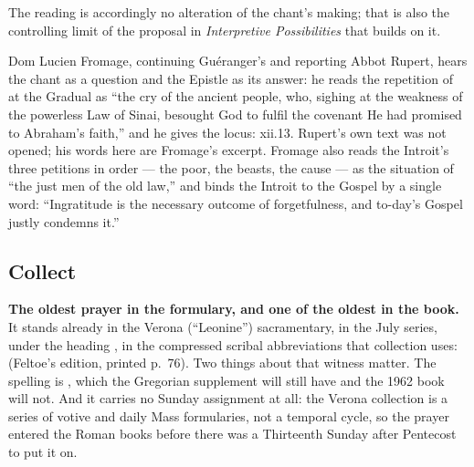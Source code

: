 The reading is accordingly no alteration of the chant's making; that is also
the controlling limit of the proposal in \textit{Interpretive Possibilities}
that builds on it.

Dom Lucien Fromage, continuing Guéranger's  and
reporting Abbot Rupert, hears the chant as a question and the Epistle as its
answer: he reads the
repetition of  at the Gradual as ``the
cry of the ancient people, who, sighing at the weakness of the powerless Law of
Sinai, besought God to fulfil the covenant He had promised to Abraham's
faith,'' and he gives the locus:  xii.13. Rupert's
own text was not opened; his words here are Fromage's excerpt.
Fromage also reads the Introit's three petitions in order --- the poor, the
beasts, the cause --- as the situation of ``the just men of the old law,'' and
binds the Introit to the Gospel by a single word: ``Ingratitude is the
necessary outcome of forgetfulness, and to-day's Gospel justly condemns it.''

\elementguard
\subsection*{Collect }


\textbf{The oldest prayer in the formulary, and one of the oldest in the
book.} It stands already in the Verona (``Leonine'') sacramentary, in the July
series, under the heading , in the compressed scribal
abbreviations that collection uses:  (Feltoe's edition, printed p.~76). Two things about that
witness matter. The spelling is , which the Gregorian
supplement will still have and the 1962 book will not. And it carries no
Sunday assignment at all: the Verona collection is a series of votive and
daily Mass formularies, not a temporal cycle, so the prayer entered the Roman
books before there was a Thirteenth Sunday after Pentecost to put it on.

